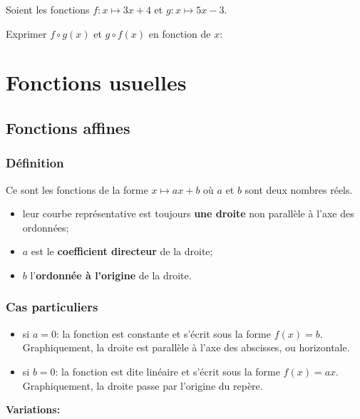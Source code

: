 \documentclass[a4paper,12pt]{scrartcl}
\begin{document}
\exemple{}
Soient les fonctions $f:x \longmapsto 3x+4$ et $g:x \longmapsto 5x-3$.

Exprimer $f \circ g (x)$ et $g \circ f (x)$ en fonction de $x$:


\section{Fonctions usuelles}

\subsection{Fonctions affines}

\subsubsection{Définition}

Ce sont les fonctions de la forme $x \longmapsto ax+b$ où $a$ et $b$ sont deux nombres réels.

\begin{itemize}
\item leur courbe représentative est toujours \textbf{une droite} non parallèle à l'axe des ordonnées;
\item $a$ est le \textbf{coefficient directeur} de la droite;
\item $b$ l'\textbf{ordonnée à l'origine} de la droite.
\end{itemize}

\begin{center}
\end{center}

\subsubsection{Cas particuliers}
\begin{itemize}
\item si $a = 0$: la fonction est constante et s'écrit sous la forme $f(x) = b$. Graphiquement, la droite est parallèle à l'axe des abscisses, ou \og horizontale. \fg{} 
\item si $b = 0$: la fonction est dite linéaire et s'écrit sous la forme $f(x) = ax$. Graphiquement, la droite passe par l'origine du repère.
\end{itemize}

\textbf{Variations:}
\end{document}
